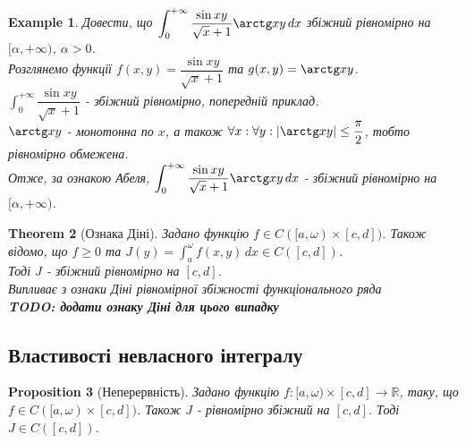 \documentclass[a4paper, 10pt]{article}
\def\huge{\displaystyle}
\theoremstyle{theoremdd}
\newtheorem{theorem}{Theorem}[subsection]
\theoremstyle{theoremdd}
\theoremstyle{theoremdd}
\theoremstyle{theoremdd}
\theoremstyle{theoremdd}
\newtheorem{example}[theorem]{Example}
\theoremstyle{theoremdd}
\newtheorem{proposition}[theorem]{Proposition}
\theoremstyle{theoremdd}
\theoremstyle{theoremdd}
\theoremstyle{theoremdd}
\begin{document}
\begin{example}
Довести, що $\huge\int_0^{+\infty} \dfrac{\sin xy}{\sqrt{x}+1} \arctg xy\,dx$ збіжний рівномірно на $[\alpha,+\infty)$, $\alpha>0$.\\
Розглянемо функції $f(x,y) = \dfrac{\sin xy}{\sqrt{x}+1}$ та $g(x,y) = \arctg xy$.\\
$\huge\int_0^{+\infty} \dfrac{\sin xy}{\sqrt{x}+1}$ - збіжний рівномірно, попередній приклад.\\
$\arctg xy$ - монотонна по $x$, а також $\forall x: \forall y: |\arctg xy| \leq \dfrac{\pi}{2}$, тобто рівномірно обмежена.\\
Отже, за ознакою Абеля, $\huge\int_0^{+\infty} \dfrac{\sin xy}{\sqrt{x}+1} \arctg xy\,dx$ - збіжний рівномірно на $[\alpha,+\infty)$.
\end{example}

\begin{theorem}[Ознака Діні]
Задано функцію $f \in C([a,\omega) \times [c,d])$. Також відомо, що $f \geq 0$ та $J(y) = \huge\int_a^\omega f(x,y)\,dx \in C([c,d])$.\\
Тоді $J$ - збіжний рівномірно на $[c,d]$.\\
\textit{Випливає з ознаки Діні рівномірної збіжності функціонального ряда}\\
\textbf{TODO: додати ознаку Діні для цього випадку}
\end{theorem}

\subsection{Властивості невласного інтегралу}
\begin{proposition}[Неперервність]
Задано функцію $f: [a,\omega) \times [c,d] \to \mathbb{R}$, таку, що $f \in C([a,\omega) \times [c,d])$. Також $J$ - рівномірно збіжний на $[c,d]$. Тоді $J \in C([c,d])$.
\end{proposition}
\end{document}
